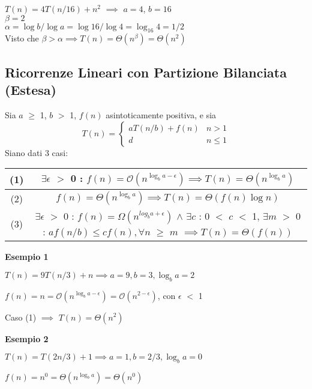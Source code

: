 \documentclass[../cheatSheetAlgoritmi.tex]{subfiles}
\begin{document}
$T(n) = 4T(n/16) + n^{2}$ $\implies$ $a = 4$, $b = 16$\\
$\beta = 2$\\
$\alpha = \log{b} / \log{a} = \log{16} / \log{4} = \log_{16}{4} = 1/2$\\
Visto che $\beta > \alpha \implies T(n) = \Theta(n^{\beta}) = \Theta(n^{2})$ 
\subsection{Ricorrenze Lineari con Partizione Bilanciata (Estesa)}
Sia $a$ $\geq$ 1, $b$ $>$ 1, $f(n)$ asintoticamente positiva, e sia
	\begin{equation*}
  		T(n)=\begin{cases}
    		aT(n/b) + f(n) & \text{$n > 1$}\\
    		d & \text{$n \leq 1$}
  		\end{cases}
	\end{equation*}
Siano dati 3 casi:

\begin{center}
	\renewcommand{\arraystretch}{1.2}
	\begin{tabular}{ |c|c| } 
		\hline
			(1) & $\exists \epsilon$ $>$ 0 : $f(n) = \mathcal{O}(n^{\log_{b}{a} - \epsilon}) \implies T(n) = \Theta(n^{\log_{b}{a}})$\\
		\hline
			(2) & $f(n) = \Theta(n^{\log_{b}{a}}) \implies T(n) = \Theta(f(n) \log{n})$\\
		\hline
			(3) & \makecell{$\exists \epsilon$ $>$ 0 : $f(n) = \Omega(n^{log_{b}{a} + \epsilon})$ $\wedge$ \\ $\exists c$ : 0 $<$ $c$ $<$ 1, $\exists m$ $>$ 0 : \\ $af(n/b) \leq cf(n), \forall n$ $\geq$ $m$} $\implies T(n) = \Theta(f(n))$ \\
		\hline
	\end{tabular}
\end{center}
\textbf{Esempio 1}

$T(n) = 9T(n/3) + n \implies a = 9, b = 3, \log_{b}{a} = 2$

$f(n) = n = \mathcal{O}(n^{\log_{b}{a} - \epsilon}) =  \mathcal{O}(n^{2 - \epsilon})$, con $\epsilon$ $<$ 1

Caso (1) $\implies$ $T(n) = \Theta(n^{2})$

\bigskip

\textbf{Esempio 2}

$T(n) = T(2n/3) + 1 \implies a = 1, b = 2/3, \log_{b}{a} = 0$

$f(n) = n^{0} = \Theta(n^{\log_{b}{a}}) =  \Theta(n^{0})$
\end{document}
